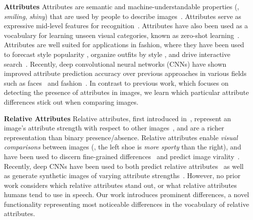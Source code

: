 \documentclass[10pt,twocolumn,letterpaper]{article}
\begin{document}
\noindent \textbf{Attributes} \hspace{1em}  Attributes are semantic and machine-understandable properties (\eg, \textit{smiling}, \textit{shiny}) that are used by people to describe images~\cite{importance, attributediscovery, virality, describingobjects, zeroshot, attributeshades, whittlesearch, simile, deeplearningface, partattribute, relativeattributes, sunattribute, spokenattributes, relativeparts, imagerankingmulti, dominance, finegrained, jnd, interestingness, babytalk, referit, humansintheloop, deepfashion, clothing, forecastingfashion, unsupervisedfashion}. Attributes serve as expressive mid-level features for recognition~\cite{sunattribute, simile, deeplearningface}. Attributes have also been used as a vocabulary for learning unseen visual categories, known as zero-shot learning~\cite{zeroshot, betweenclassattribute, dominance, relativeattributes}. Attributes are well suited for applications in fashion, where they have been used to forecast style popularity \cite{forecastingfashion}, organize outfits by style \cite{unsupervisedfashion}, and drive interactive search~\cite{fashionsearch}. Recently, deep convolutional neural networks (CNNs) have shown improved attribute prediction accuracy over previous approaches in various fields such as faces~\cite{deeplearningface} and fashion~\cite{deepfashion}. In contrast to previous work, which focuses on detecting the presence of attributes in images, we learn which particular attribute differences stick out when comparing images.

\vspace{0.25cm}

\noindent \textbf{Relative Attributes} \hspace{1em} Relative attributes, first introduced in~\cite{relativeattributes}, represent an image's attribute strength with respect to other images~\cite{virality, robustsubjective, whittlesearch, partattribute, finegrained, jnd, deeprelative, deeprelative2, deeprelative3, spokenattributes, semanticjitter}, and are a richer representation than binary presence/absence. Relative attributes enable \textit{visual comparisons} between images (\eg, the left shoe is \textit{more sporty} than the right), and have been used to discern fine-grained differences~\cite{finegrained, jnd} and predict image virality~\cite{virality}. Recently, deep CNNs have been used to both predict relative attributes~\cite{deeprelative, deeprelative2, deeprelative3} as well as generate synthetic images of varying attribute strengths~\cite{semanticjitter, attributetoimage}. However, no prior work considers which relative attributes stand out, or what relative attributes humans tend to use in speech. Our work introduces prominent differences, a novel functionality representing most noticeable differences in the vocabulary of relative attributes.
\end{document}
